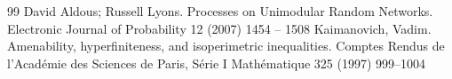 \documentclass[10pt,a4paper]{amsart}
\begin{document}
\begin{thebibliography}{99}
 David Aldous; Russell Lyons. Processes on Unimodular Random Networks. Electronic Journal of Probability 12 (2007) 1454 -- 1508
 Kaimanovich, Vadim. Amenability, hyperfiniteness, and isoperimetric inequalities. Comptes Rendus de l'Acad{\'e}mie des Sciences de Paris, S{\'e}rie I Math{\'e}matique 325 (1997) 999--1004
\end{thebibliography}
\end{document}
